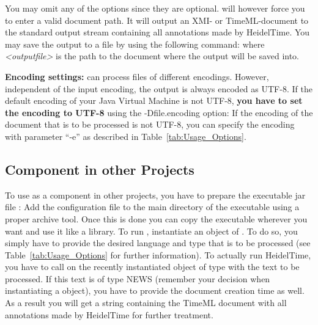 You may omit any of the options since they are optional. \product{} will however force you to enter a valid document path. It will output an XMI- or TimeML-document to the standard output stream containing all annotations made by HeidelTime. You may save the output to a file by using the following command:\newline \texttt{} where \emph{<outputfile>} is the path to the document where the output will be saved into.

\textbf{Encoding settings:}
\product{} can process files of different encodings. However, independent of the input encoding, the output is always encoded as UTF-8. If the default encoding of your Java Virtual Machine is not UTF-8, \textbf{you have to set the encoding to UTF-8} using the -Dfile.encoding option:
\newline \texttt{}\newline
If the encoding of the document that is to be processed is not UTF-8, you can specify the encoding with parameter ``-e'' as described in Table~\ref{tab:Usage_Options}.

\subsection{Component in other Projects}\label{sec:Usage_Component}
To use \product{} as a component in other projects, you have to prepare the executable jar file \executableFile{}: Add the configuration file \configFile{} to the main directory of the executable using a proper archive tool. Once this is done you can copy the executable wherever you want and use it like a library. To run \product{}, instantiate an object of . To do so, you simply have to provide the desired language and type that is to be processed (see Table~\ref{tab:Usage_Options} for further information). To actually run HeidelTime, you have to call  on the recently instantiated object of type  with the text to be processed. If this text is of type NEWS (remember your decision when instantiating a  object), you have to provide the document creation time as well. As a result you will get a string containing the TimeML document with all annotations made by HeidelTime for further treatment.
